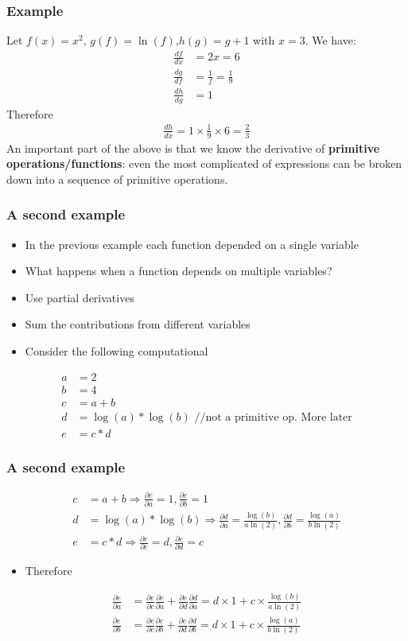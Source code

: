 \documentclass{beamer}
\theoremstyle{plain} %
\theoremstyle{example} %
\newcommand{\deriv}[2]{\ensuremath{\frac{\partial #1}{\partial #2}}}
\begin{document}
\begin{frame}
    \frametitle{Example}
    Let $f(x)=x^2$, $g(f)=\ln(f)$,$h(g)=g+1$ with $x=3$. We have:
    \begin{align*}
        \frac{df}{dx}&=2x=6\\
        \frac{dg}{df}&=\frac{1}{f}=\frac{1}{9}\\
        \frac{dh}{dg}&=1
    \end{align*}
  Therefore
  \begin{align*}
    \frac{dh}{dx}=1\times\frac{1}{9}\times 6=\frac{2}{3}
  \end{align*}  
An important part of the above is that we know the derivative of \textbf{primitive operations/functions}: even the most complicated of expressions can be broken down into a sequence of primitive operations.
\end{frame}
\begin{frame}
    \frametitle{A second example}
    \begin{itemize}
        \item In the previous example each function depended on a single variable
        \item What happens when a function depends on multiple variables?
        \item Use partial derivatives
        \item Sum the contributions from different variables
        \item Consider the following computational
    \end{itemize}
   
\begin{align*}
    a&=2\\
    b&=4\\
    c&=a+b\\
    d&=\log(a)*\log(b) \text{  //not a primitive op. More later}\\
    e&=c*d
\end{align*}    

\end{frame}
\begin{frame}
    \frametitle{A second example}
   
\begin{align*}
    c&=a+b\Rightarrow \deriv{c}{a}=1, \deriv{c}{b}=1\\
    d&=\log(a)*\log(b)\Rightarrow \deriv{d}{a}=\frac{\log(b)}{a\ln(2)},\deriv{d}{b}=\frac{\log(a)}{b\ln(2)}\\
    e&=c*d\Rightarrow \deriv{e}{c}=d,\deriv{e}{d}=c
\end{align*}    
\begin{itemize}
    \item Therefore
\end{itemize}
\begin{align*}
    \deriv{e}{a}&=\deriv{e}{c}\deriv{c}{a}+\deriv{e}{d}\deriv{d}{a}=d\times 1+c\times \frac{\log(b)}{a\ln(2)}\\
    \deriv{e}{b}&=\deriv{e}{c}\deriv{c}{b}+\deriv{e}{d}\deriv{d}{b}=d\times 1+c\times \frac{\log(a)}{b\ln(2)}
\end{align*}
\end{frame}
\end{document}
